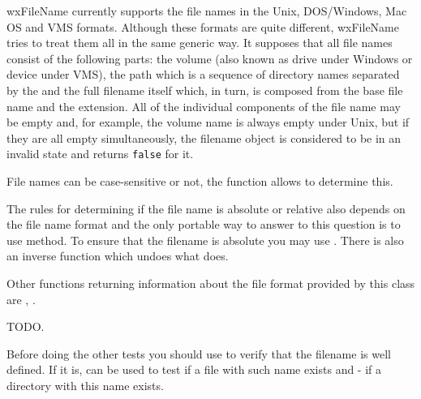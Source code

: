 \label{filenameformat}

wxFileName currently supports the file names in the Unix, DOS/Windows, Mac OS
and VMS formats. Although these formats are quite different, wxFileName tries
to treat them all in the same generic way. It supposes that all file names
consist of the following parts: the volume (also known as drive under Windows
or device under VMS), the path which is a sequence of directory names separated
by the  and the full
filename itself which, in turn, is composed from the base file name and the
extension. All of the individual components of the file name may be empty and,
for example, the volume name is always empty under Unix, but if they are all
empty simultaneously, the filename object is considered to be in an invalid
state and  returns {\tt false} for it.

File names can be case-sensitive or not, the function\rtfsp
{} allows to determine this.

The rules for determining if the file name is absolute or relative also depends
on the file name format and the only portable way to answer to this question is
to use  method. To ensure that the
filename is absolute you may use .
There is also an inverse function 
 which undoes what
 does.

Other functions returning information about the file format provided by this
class are ,\rtfsp
{}.



\label{filenameconstruction}

TODO.


\label{filetests}

Before doing the other tests you should use  to
verify that the filename is well defined. If it is, 
 can be used to test if a file with
such name exists and  - if a directory
with this name exists.

